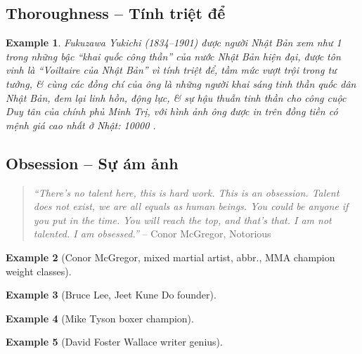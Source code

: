 \documentclass[12pt,twoside]{book}
\newtheorem{example}{Example}
\begin{document}
\subsection{Thoroughness -- Tính triệt để}

\begin{example}
	{\sc Fukuzawa Yukichi} (1834--1901) được người Nhật Bản xem như 1 trong những bậc ``khai quốc công thần'' của nước Nhật Bản hiện đại, được tôn vinh là ``Voiltaire của Nhật Bản'' vì tính triệt để, tầm mức vượt trội trong tư tưởng, \& cùng các đồng chí của ông là những người khai sáng tinh thần quốc dân Nhật Bản, đem lại linh hồn, động lực, \& sự hậu thuẫn tinh thần cho công cuộc Duy tân của chính phủ Minh Trị, với hình ảnh ông được in trên đồng tiền có mệnh giá cao nhất ở Nhật: {\rm10000 \textyen}  {\rm\cite{Yukichi_encourage_learn,Yukichi_khuyen_hoc}}.
\end{example}

\subsection{Obsession -- Sự ám ảnh}

\begin{quotation}
	{\it``There's no talent here, this is hard work. This is an obsession. Talent does not exist, we are all equals as human beings. You could be anyone if you put in the time. You will reach the top, and that's that. I am not talented. I am obsessed.''} -- {\sc Conor McGregor}, Notorious
\end{quotation}

\begin{example}[{\sc Conor McGregor}, mixed martial artist, abbr., MMA champion weight classes]
	
\end{example}

\begin{example}[{\sc Bruce Lee}, Jeet Kune Do founder]
	
\end{example}

\begin{example}[{\sc Mike Tyson} boxer champion]
	
\end{example}

\begin{example}[{\sc David Foster Wallace} writer genius]
	
\end{example}
\end{document}
